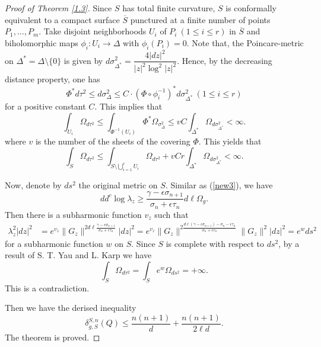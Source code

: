 \documentclass[12pt,article]{amsart}
\numberwithin{equation}{section}
\begin{document}
\begin{proof}[Proof of Theorem \ref{1.3}]
Since $S$ has total finite curvature, $S$ is conformally equivalent to a compact surface $\overline S$ punctured at a finite number of points $P_1,\ldots,P_m$. Take disjoint neighborhoods $U_i$ of $P_i\ (1\le i\le r)$ in $\overline S$ and biholomorphic maps $\phi_i:U_i\rightarrow\Delta$ with $\phi_i(P_i)=0$. Note that, the Poincare-metric on $\Delta^*=\Delta\setminus\{0\}$ is given by $d\sigma_{\Delta^*}^2=\dfrac{4|dz|^2}{|z|^2\log^2|z|^2}$. Hence, by the decreasing distance property, one has
$$\Phi^*d\tau^2\le d\sigma_\Delta^2\le C\cdot(\Phi\circ\phi_i^{-1})^*d\sigma_{\Delta^*}^2\ (1\le i\le r)$$
for a positive constant $C$. This implies that
$$\int_{U_i}\Omega_{d\tau^2}\le \int_{\Phi^{-1}(U_i)}\Phi^*\Omega_{\sigma_\Delta^2}\le vC\int_{\Delta^*}\Omega_{d\sigma_{\Delta^*}^2}<\infty.$$
where $v$ is the number of the sheets of the covering $\Phi$. This yields that
$$\int_S\Omega_{d\tau^2}\le \int_{S\setminus\bigcup_{i=1}^rU_i}\Omega_{d\tau^2}+vCr\int_{\Delta^*}\Omega_{d\sigma_{\Delta^*}^2}<\infty.$$

Now, denote by $ds^2$ the original metric on $S$. Similar as (\ref{new3}), we have
$$ dd^c\log\lambda_z \ge\dfrac{\gamma-\epsilon\sigma_{n+1}}{\sigma_n+\epsilon\tau_n}d\ell\Omega_g.$$ 
Then there is a subharmonic function $v_z$ such that
\begin{align*}
\lambda_z^2|dz|^2&=e^{v_z}\|G_z\|^{2d\ell\frac{\gamma-\epsilon\sigma_{n+1}}{\sigma_n+\epsilon\tau_n}}|dz|^2=e^{v_z}\|G_z\|^{2\frac{d\ell(\gamma-\epsilon\sigma_{n+1})-\sigma_n-\epsilon\tau_n}{\sigma_n+\epsilon\tau_n}}\|G_z\|^2 |dz|^2=e^w ds^2
\end{align*}
for a subharmonic function $w$ on $S$. Since $S$ is complete with respect to $ds^2$, by a result of S. T. Yau \cite{Y76} and L. Karp \cite{K82} we have
$$ \int_S\Omega_{d\tau^2}=\int_Se^w\Omega_{ds^2}=+\infty.$$
This is a contradiction.

Then we have the derised inequality
$$\delta^{S,n}_{g,S}(Q)\le\frac{n(n+1)}{d}+\frac{n(n+1)}{2\ell d}.$$
The theorem is proved.
\end{proof}
\end{document}
